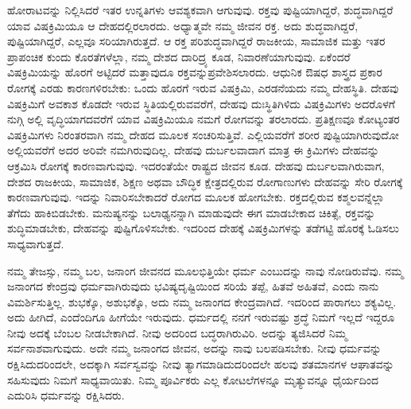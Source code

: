 ಹೋರಾಟವನ್ನು ನಿಲ್ಲಿಸಿದರೆ ಇತರ ಉನ್ನತಿಗಳು ಆವಶ್ಯಕವಾಗಿ ಆಗುವುವು. ರಕ್ತವು ಪುಷ್ಟಿಯಾಗಿದ್ದರೆ, ಶುದ್ಧವಾಗಿದ್ದರೆ ಯಾವ ವಿಷಕ್ರಿಮಿಯೂ ಆ ದೇಹದಲ್ಲಿರಲಾರದು. ಅಧ್ಯಾತ್ಮವೇ ನಮ್ಮ ಜೀವನ ರಕ್ತ. ಅದು ಶುದ್ಧವಾಗಿದ್ದರೆ, ಪುಷ್ಟಿಯಾಗಿದ್ದರೆ, ಎಲ್ಲವೂ ಸರಿಯಾಗಿರುತ್ತದೆ. ಆ ರಕ್ತ ಪರಿಶುದ್ಧವಾಗಿದ್ದರೆ ರಾಜಕೀಯ, ಸಾಮಾಜಿಕ ಮತ್ತು ಇತರ ಪ್ರಾಪಂಚಿಕ ಕುಂದು ಕೊರತೆಗಳೆಲ್ಲಾ, ನಮ್ಮ ದೇಶದ ದಾರಿದ್ರ್ಯ ಕೂಡ, ನಿವಾರಣೆಯಾಗುವುವು. ಏಕೆಂದರೆ ವಿಷಕ್ರಿಮಿಯನ್ನು ಹೊರಗೆ ಅಟ್ಟಿದರೆ ಮತ್ತಾವುದೂ ರಕ್ತವನ್ನು\break ಪ್ರವೇಶಿಸಲಾರದು. ಆಧುನಿಕ ಔಷಧ ಶಾಸ್ತ್ರದ ಪ್ರಕಾರ ರೋಗಕ್ಕೆ ಎರಡು ಕಾರಣಗಳಿರಬೇಕು: ಒಂದು ಹೊರಗೆ ಇರುವ ವಿಷಕ್ರಿಮಿ, ಎರಡನೆಯದು ನಮ್ಮ ದೇಹಸ್ಥಿತಿ. ದೇಹವು ವಿಷಕ್ರಿಮಿಗೆ ಅವಕಾಶ ಕೊಡದೇ ಇರುವ ಸ್ಥಿತಿಯಲ್ಲಿರುವವರೆಗೆ, ದೇಹವು ದುಃಸ್ಥಿತಿಗಿಳಿದು ವಿಷಕ್ರಿಮಿಗಳು ಅದರೊಳಗೆ ನುಗ್ಗಿ ಅಲ್ಲಿ ವೃದ್ಧಿಯಾಗದವರೆಗೆ ಯಾವ ವಿಷಕ್ರಿಮಿಯೂ ನಮಗೆ ರೋಗವನ್ನು ತರಲಾರದು. ಪ್ರತಿಕ್ಷಣವೂ ಕೋಟ್ಯಂತರ ವಿಷಕ್ರಿಮಿಗಳು ನಿರಂತರವಾಗಿ ನಮ್ಮ ದೇಹದ ಮೂಲಕ ಸಂಚರಿಸುತ್ತಿವೆ. ಎಲ್ಲಿಯವರೆಗೆ ಶರೀರ ಪುಷ್ಟಿಯಾಗಿರುವುದೋ ಅಲ್ಲಿಯವರೆಗೆ ಅದರ ಅರಿವೇ ನಮಗಿರುವುದಿಲ್ಲ. ದೇಹವು ದುರ್ಬಲವಾದಾಗ ಮಾತ್ರ ಈ ಕ್ರಿಮಿಗಳು ದೇಹವನ್ನು ಆಕ್ರಮಿಸಿ ರೋಗಕ್ಕೆ ಕಾರಣವಾಗುವುವು. ಇದರಂತೆಯೇ ರಾಷ್ಟ್ರದ ಜೀವನ ಕೂಡ. ದೇಹವು ದುರ್ಬಲವಾಗಿರುವಾಗ, ದೇಶದ ರಾಜಕೀಯ, ಸಾಮಾಜಿಕ, ಶಿಕ್ಷಣ ಅಥವಾ ಬೌದ್ಧಿಕ ಕ್ಷೇತ್ರದಲ್ಲಿರುವ ರೋಗಾಣುಗಳು ದೇಹವನ್ನು ಸೇರಿ ರೋಗಕ್ಕೆ ಕಾರಣವಾಗುವುವು. ಇದನ್ನು ನಿವಾರಿಸಬೇಕಾದರೆ ರೋಗದ ಮೂಲಕ ಹೋಗಬೇಕು. ರಕ್ತದಲ್ಲಿರುವ ಕಶ್ಮಲವನ್ನೆಲ್ಲಾ ತೆಗೆದು ಹಾಕಿಬಿಡಬೇಕು. ಮನುಷ್ಯನನ್ನು ಬಲಾಢ್ಯನನ್ನಾಗಿ ಮಾಡುವುದೇ ಈಗ ಮಾಡಬೇಕಾದ ಚಿಕಿತ್ಸೆ, ರಕ್ತವನ್ನು ಶುದ್ಧಿಮಾಡಬೇಕು, ದೇಹವನ್ನು ಪುಷ್ಟಿಗೊಳಿಸಬೇಕು. ಇದರಿಂದ ದೇಹಕ್ಕೆ ವಿಷಕ್ರಿಮಿಗಳನ್ನು ತಡೆಗಟ್ಟಿ ಹೊರಕ್ಕೆ ಓಡಿಸಲು ಸಾಧ್ಯವಾಗುತ್ತದೆ.

ನಮ್ಮ ತೇಜಸ್ಸು, ನಮ್ಮ ಬಲ, ಜನಾಂಗ ಜೀವನದ ಮೂಲಭಿತ್ತಿಯೇ ಧರ್ಮ ಎಂಬುದನ್ನು ನಾವು ನೋಡಿರುವೆವು. ನಮ್ಮ ಜನಾಂಗದ ಕೇಂದ್ರವು ಧರ್ಮವಾಗಿರುವುದು ಭವಿಷ್ಯದೃಷ್ಟಿಯಿಂದ ಸರಿಯೆ ತಪ್ಪೆ, ಹಿತವೆ ಅಹಿತವೆ, ಎಂದು ನಾನು ವಿಮರ್ಶಿಸುತ್ತಿಲ್ಲ. ಶುಭಕ್ಕೊ, ಅಶುಭಕ್ಕೊ, ಅದು ನಮ್ಮ ಜನಾಂಗದ ಕೇಂದ್ರವಾಗಿದೆ. ಇದರಿಂದ ಪಾರಾಗಲು ಶಕ್ಯವಿಲ್ಲ. ಅದು ಹೀಗಿದೆ, ಎಂದೆಂದಿಗೂ ಹೀಗೆಯೇ ಇರುವುದು. ಧರ್ಮದಲ್ಲಿ ನನಗೆ ಇರುವಷ್ಟು ಶ್ರದ್ಧೆ ನಿಮಗೆ ಇಲ್ಲದೆ ಇದ್ದರೂ ನೀವು ಅದಕ್ಕೆ ಬೆಂಬಲ ನೀಡಬೇಕಾಗಿದೆ. ನೀವು ಅದರಿಂದ ಬದ್ಧರಾಗಿರುವಿರಿ. ಅದನ್ನು ತ್ಯಜಿಸಿದರೆ ನಿಮ್ಮ ಸರ್ವನಾಶವಾಗುವುದು. ಅದೇ ನಮ್ಮ ಜನಾಂಗದ ಜೀವನ, ಅದನ್ನು ನಾವು ಬಲಪಡಿಸಬೇಕು. ನೀವು ಧರ್ಮವನ್ನು ರಕ್ಷಿಸಿದುದರಿಂದಲೇ, ಅದಕ್ಕಾಗಿ ಸರ್ವಸ್ವವನ್ನು ನೀವು ತ್ಯಾಗಮಾಡಿದುದರಿಂದಲೇ ಹಲವು ಶತಮಾನಗಳ ಆಘಾತವನ್ನು ಸಹಿಸುವುದು ನಿಮಗೆ ಸಾಧ್ಯವಾಯಿತು. ನಿಮ್ಮ ಪೂರ್ವಿಕರು ಎಲ್ಲ ಕೋಟಲೆಗಳನ್ನೂ ಮೃತ್ಯುವನ್ನೂ ಧೈರ್ಯದಿಂದ ಎದುರಿಸಿ ಧರ್ಮವನ್ನು ರಕ್ಷಿಸಿದರು.

